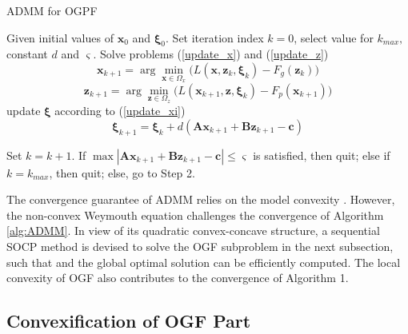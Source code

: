 \documentclass[journal]{IEEEtran}
\begin{document}
\begin{algorithm}[!t]
\caption{ADMM for OGPF}
\label{alg:ADMM}
\begin{algorithmic}[1]
\STATE Given initial values of ${\boldsymbol{{x}}}_0$ and ${\boldsymbol{{\xi}}}_0$. Set iteration index $k=0$, select value for $k_{max}, $constant $d$ and $\varsigma$.
\STATE Solve problems (\ref{update_x}) and (\ref{update_z})
\begin{equation}\label{update_x}
  {\boldsymbol{{x}}}_{k+1}=\arg{\min_{{\boldsymbol{{x}}}\in\Omega_x}(L({\boldsymbol{{x}}},{\boldsymbol{{z}}}_k,{\boldsymbol{{\xi}}}_k)}-F_g({\boldsymbol{{z}}}_k))
\end{equation}
\begin{equation}\label{update_z}
  {\boldsymbol{{z}}}_{k+1}=\arg{\min_{{\boldsymbol{{z}}}\in\Omega_z}(L({\boldsymbol{{x}}}_{k+1},{\boldsymbol{{z}}},{\boldsymbol{{\xi}}}_k)}-F_p({\boldsymbol{{x}}}_{k+1}))
\end{equation}
update ${\boldsymbol{{\xi}}}$ according to (\ref{update_xi})
\begin{equation}\label{update_xi}
  {\boldsymbol{{\xi}}}_{k+1}={\boldsymbol{{\xi}}}_k+d({\boldsymbol{{Ax}}}_{k+1}+{\boldsymbol{{Bz}}}_{k+1}-{\boldsymbol{{c}}})
\end{equation}

\STATE Set $k=k+1$. If $\max|{\boldsymbol{{Ax}}}_{k+1}+{\boldsymbol{{Bz}}}_{k+1}-{\boldsymbol{{c}}}|\le\varsigma$ is satisfied, then quit; else if $k=k_{max}$, then quit; else, go to Step 2.
\end{algorithmic}
\end{algorithm}

The convergence guarantee of ADMM relies on the model convexity \cite{Boyd_ADMM}. However, the non-convex Weymouth equation challenges the convergence of Algorithm \ref{alg:ADMM}. In view of its quadratic convex-concave structure, a sequential SOCP method is devised to solve the OGF subproblem in the next subsection, such that and the global optimal solution can be efficiently computed. The local convexity of OGF also contributes to the convergence of Algorithm 1.

\subsection{Convexification of OGF Part}
\end{document}
